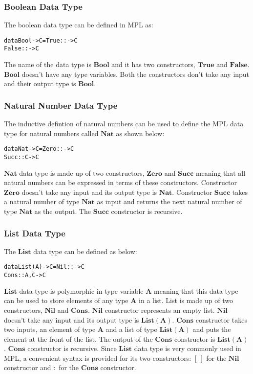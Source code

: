 \documentclass[11pt]{article}
\begin{document}
\subsubsection {Boolean Data Type}
The boolean data type can be defined in MPL as:
\begin{alltt}
          data Bool -> C = True  :: -> C 
                           False :: -> C
\end{alltt}
The name of the data type is $\mathbf{Bool}$ and it has two constructors, $\mathbf{True}$ and $\mathbf{False}$. $\mathbf{Bool}$ doesn't have any type variables. Both the constructors don't take any input and their output type is $\mathbf{Bool}$. 
\subsubsection {Natural Number Data Type} 
The inductive defintion of natural numbers can be used to define the MPL data type for natural numbers called $\mathbf{Nat}$ as shown below:
\begin{alltt}
          data Nat -> C = Zero  ::   -> C 
                          Succ  :: C -> C
\end{alltt}
$\mathbf{Nat}$ data type is made up of two constructors, $\mathbf{Zero}$ and $\mathbf{Succ}$ meaning that all natural numbers can be expressed in terms of these constructors. Constructor $\mathbf{Zero}$ doesn't take any input and its output type is $\mathbf{Nat}$. Constructor $\mathbf{Succ}$ takes a natural number of type $\mathbf{Nat}$ as input and returns the next natural number of type $\mathbf{Nat}$ as the output. The $\mathbf{Succ}$ constructor is recursive.
\subsubsection {List Data Type}
The $\mathbf{List}$ data type can be defined as below:
\begin{alltt}
          data List(A) -> C = Nil   ::     -> C 
                              Cons  :: A,C -> C
\end{alltt}
$\mathbf{List}$ data type is polymorphic in type variable $\mathbf{A}$ meaning that this data type can be used to store elements of any type $\mathbf{A}$ in a list. List is made up of two constructors, $\mathbf{Nil}$ and $\mathbf{Cons}$. $\mathbf{Nil}$ constructor represents an empty list. $\mathbf{Nil}$ doesn't take any input and its output type is $\mathbf{List(A)}$. $\mathbf{Cons}$ constructor takes two inputs, an element of type $\mathbf{A}$ and a list of type $\mathbf{List(A)}$ and puts the element at the front of the list. The output of the $\mathbf{Cons}$ constructor is $\mathbf{List(A)}$. $\mathbf{Cons}$ constructor is recursive. Since $\mathbf{List}$ data type is very commonly used in MPL, a convenient syntax is provided for its two constructors: $\mathbf {[~]}$ for the $\mathbf{Nil}$ constructor and $\mathbf {:}$ for the $\mathbf{Cons}$ constructor.
\end{document}
